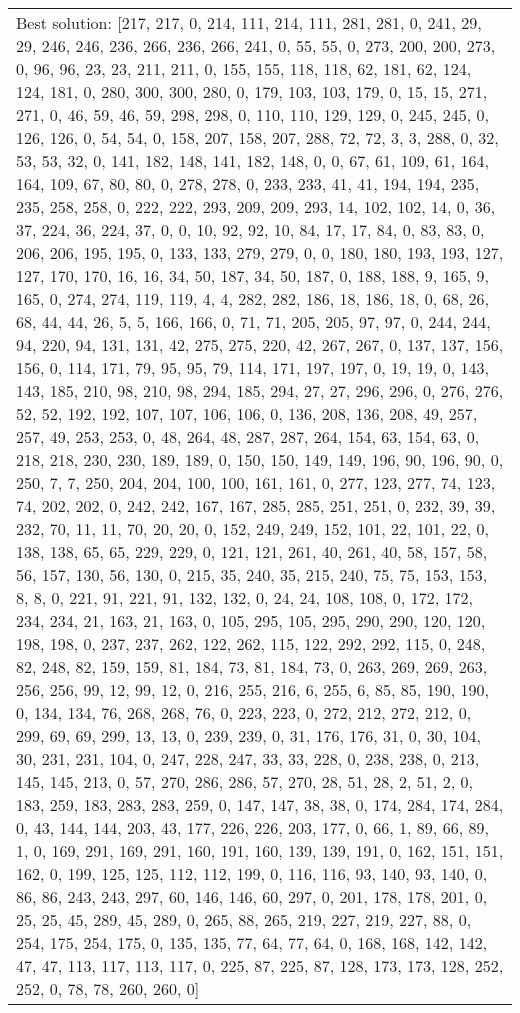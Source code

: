 \documentclass[]{article}
\begin{document}
\begin{table}[!ht]
\begin{tabular}{|m{3.2cm}|>{\centering\arraybackslash}m{2.8cm}|>{\centering\arraybackslash}m{2.8cm}|>{\centering\arraybackslash}m{2.8cm}|>{\centering\arraybackslash}m{2.8cm}|}
		\multicolumn{5}{|m{14cm}|}{Best solution: [217, 217, 0, 214, 111, 214, 111, 281, 281, 0, 241, 29, 29, 246, 246, 236, 266, 236, 266, 241, 0, 55, 55, 0, 273, 200, 200, 273, 0, 96, 96, 23, 23, 211, 211, 0, 155, 155, 118, 118, 62, 181, 62, 124, 124, 181, 0, 280, 300, 300, 280, 0, 179, 103, 103, 179, 0, 15, 15, 271, 271, 0, 46, 59, 46, 59, 298, 298, 0, 110, 110, 129, 129, 0, 245, 245, 0, 126, 126, 0, 54, 54, 0, 158, 207, 158, 207, 288, 72, 72, 3, 3, 288, 0, 32, 53, 53, 32, 0, 141, 182, 148, 141, 182, 148, 0, 0, 67, 61, 109, 61, 164, 164, 109, 67, 80, 80, 0, 278, 278, 0, 233, 233, 41, 41, 194, 194, 235, 235, 258, 258, 0, 222, 222, 293, 209, 209, 293, 14, 102, 102, 14, 0, 36, 37, 224, 36, 224, 37, 0, 0, 10, 92, 92, 10, 84, 17, 17, 84, 0, 83, 83, 0, 206, 206, 195, 195, 0, 133, 133, 279, 279, 0, 0, 180, 180, 193, 193, 127, 127, 170, 170, 16, 16, 34, 50, 187, 34, 50, 187, 0, 188, 188, 9, 165, 9, 165, 0, 274, 274, 119, 119, 4, 4, 282, 282, 186, 18, 186, 18, 0, 68, 26, 68, 44, 44, 26, 5, 5, 166, 166, 0, 71, 71, 205, 205, 97, 97, 0, 244, 244, 94, 220, 94, 131, 131, 42, 275, 275, 220, 42, 267, 267, 0, 137, 137, 156, 156, 0, 114, 171, 79, 95, 95, 79, 114, 171, 197, 197, 0, 19, 19, 0, 143, 143, 185, 210, 98, 210, 98, 294, 185, 294, 27, 27, 296, 296, 0, 276, 276, 52, 52, 192, 192, 107, 107, 106, 106, 0, 136, 208, 136, 208, 49, 257, 257, 49, 253, 253, 0, 48, 264, 48, 287, 287, 264, 154, 63, 154, 63, 0, 218, 218, 230, 230, 189, 189, 0, 150, 150, 149, 149, 196, 90, 196, 90, 0, 250, 7, 7, 250, 204, 204, 100, 100, 161, 161, 0, 277, 123, 277, 74, 123, 74, 202, 202, 0, 242, 242, 167, 167, 285, 285, 251, 251, 0, 232, 39, 39, 232, 70, 11, 11, 70, 20, 20, 0, 152, 249, 249, 152, 101, 22, 101, 22, 0, 138, 138, 65, 65, 229, 229, 0, 121, 121, 261, 40, 261, 40, 58, 157, 58, 56, 157, 130, 56, 130, 0, 215, 35, 240, 35, 215, 240, 75, 75, 153, 153, 8, 8, 0, 221, 91, 221, 91, 132, 132, 0, 24, 24, 108, 108, 0, 172, 172, 234, 234, 21, 163, 21, 163, 0, 105, 295, 105, 295, 290, 290, 120, 120, 198, 198, 0, 237, 237, 262, 122, 262, 115, 122, 292, 292, 115, 0, 248, 82, 248, 82, 159, 159, 81, 184, 73, 81, 184, 73, 0, 263, 269, 269, 263, 256, 256, 99, 12, 99, 12, 0, 216, 255, 216, 6, 255, 6, 85, 85, 190, 190, 0, 134, 134, 76, 268, 268, 76, 0, 223, 223, 0, 272, 212, 272, 212, 0, 299, 69, 69, 299, 13, 13, 0, 239, 239, 0, 31, 176, 176, 31, 0, 30, 104, 30, 231, 231, 104, 0, 247, 228, 247, 33, 33, 228, 0, 238, 238, 0, 213, 145, 145, 213, 0, 57, 270, 286, 286, 57, 270, 28, 51, 28, 2, 51, 2, 0, 183, 259, 183, 283, 283, 259, 0, 147, 147, 38, 38, 0, 174, 284, 174, 284, 0, 43, 144, 144, 203, 43, 177, 226, 226, 203, 177, 0, 66, 1, 89, 66, 89, 1, 0, 169, 291, 169, 291, 160, 191, 160, 139, 139, 191, 0, 162, 151, 151, 162, 0, 199, 125, 125, 112, 112, 199, 0, 116, 116, 93, 140, 93, 140, 0, 86, 86, 243, 243, 297, 60, 146, 146, 60, 297, 0, 201, 178, 178, 201, 0, 25, 25, 45, 289, 45, 289, 0, 265, 88, 265, 219, 227, 219, 227, 88, 0, 254, 175, 254, 175, 0, 135, 135, 77, 64, 77, 64, 0, 168, 168, 142, 142, 47, 47, 113, 117, 113, 117, 0, 225, 87, 225, 87, 128, 173, 173, 128, 252, 252, 0, 78, 78, 260, 260, 0]}\\

\end{tabular}
\end{table}
\end{document}
